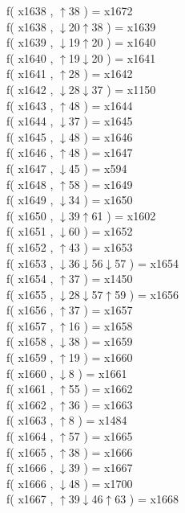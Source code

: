 f( x1638 , $\uparrow$38 ) = x1672 \\
f( x1638 , $\downarrow$20$\uparrow$38 ) = x1639 \\
f( x1639 , $\downarrow$19$\uparrow$20 ) = x1640 \\
f( x1640 , $\uparrow$19$\downarrow$20 ) = x1641 \\
f( x1641 , $\uparrow$28 ) = x1642 \\
f( x1642 , $\downarrow$28$\downarrow$37 ) = x1150 \\
f( x1643 , $\uparrow$48 ) = x1644 \\
f( x1644 , $\downarrow$37 ) = x1645 \\
f( x1645 , $\downarrow$48 ) = x1646 \\
f( x1646 , $\uparrow$48 ) = x1647 \\
f( x1647 , $\downarrow$45 ) = x594 \\
f( x1648 , $\uparrow$58 ) = x1649 \\
f( x1649 , $\downarrow$34 ) = x1650 \\
f( x1650 , $\downarrow$39$\uparrow$61 ) = x1602 \\
f( x1651 , $\downarrow$60 ) = x1652 \\
f( x1652 , $\uparrow$43 ) = x1653 \\
f( x1653 , $\downarrow$36$\downarrow$56$\downarrow$57 ) = x1654 \\
f( x1654 , $\uparrow$37 ) = x1450 \\
f( x1655 , $\downarrow$28$\downarrow$57$\uparrow$59 ) = x1656 \\
f( x1656 , $\uparrow$37 ) = x1657 \\
f( x1657 , $\uparrow$16 ) = x1658 \\
f( x1658 , $\downarrow$38 ) = x1659 \\
f( x1659 , $\uparrow$19 ) = x1660 \\
f( x1660 , $\downarrow$8 ) = x1661 \\
f( x1661 , $\uparrow$55 ) = x1662 \\
f( x1662 , $\uparrow$36 ) = x1663 \\
f( x1663 , $\uparrow$8 ) = x1484 \\
f( x1664 , $\uparrow$57 ) = x1665 \\
f( x1665 , $\uparrow$38 ) = x1666 \\
f( x1666 , $\downarrow$39 ) = x1667 \\
f( x1666 , $\downarrow$48 ) = x1700 \\
f( x1667 , $\uparrow$39$\downarrow$46$\uparrow$63 ) = x1668 \\
